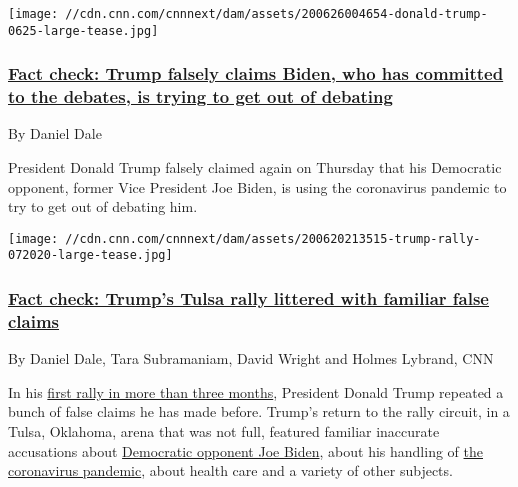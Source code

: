 \href{/2020/06/26/politics/fact-check-trump-biden-debates/index.html}{}

\texttt{[image: //cdn.cnn.com/cnnnext/dam/assets/200626004654-donald-trump-0625-large-tease.jpg]}

\hypertarget{fact-check-trump-falsely-claims-biden-who-has-committed-to-the-debates-is-trying-to-get-out-of-debating-}{%
\subsubsection{\texorpdfstring{\href{/2020/06/26/politics/fact-check-trump-biden-debates/index.html}{Fact
check: Trump falsely claims Biden, who has committed to the debates, is
trying to get out of debating
}}{Fact check: Trump falsely claims Biden, who has committed to the debates, is trying to get out of debating }}\label{fact-check-trump-falsely-claims-biden-who-has-committed-to-the-debates-is-trying-to-get-out-of-debating-}}

By Daniel Dale

President Donald Trump falsely claimed again on Thursday that his
Democratic opponent, former Vice President Joe Biden, is using the
coronavirus pandemic to try to get out of debating him.

\href{/2020/06/21/politics/fact-check-donald-trump-tulsa-rally/index.html}{}

\texttt{[image: //cdn.cnn.com/cnnnext/dam/assets/200620213515-trump-rally-072020-large-tease.jpg]}

\hypertarget{fact-check-trumps-tulsa-rally-littered-with-familiar-false-claims}{%
\subsubsection{\texorpdfstring{\href{/2020/06/21/politics/fact-check-donald-trump-tulsa-rally/index.html}{Fact
check: Trump's Tulsa rally littered with familiar false
claims}}{Fact check: Trump's Tulsa rally littered with familiar false claims}}\label{fact-check-trumps-tulsa-rally-littered-with-familiar-false-claims}}

By Daniel Dale, Tara Subramaniam, David Wright and Holmes Lybrand, CNN

In his
\href{https://www.cnn.com/2020/06/20/politics/tulsa-rally-trump/index.html}{first
rally in more than three months}, President Donald Trump repeated a
bunch of false claims he has made before. Trump's return to the rally
circuit, in a Tulsa, Oklahoma, arena that was not full, featured
familiar inaccurate accusations about
\href{https://www.cnn.com/election/2020/candidate/biden}{Democratic
opponent Joe Biden}, about his handling of
\href{https://www.cnn.com/interactive/2020/health/coronavirus-us-maps-and-cases/}{the
coronavirus pandemic}, about health care and a variety of other
subjects.

